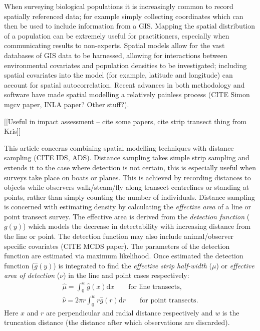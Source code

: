 \documentclass[useAMS,referee]{biom}
\begin{document}
When surveying biological populations it is increasingly common to record spatially referenced data; for example simply collecting coordinates which can then be used to include information from a GIS. Mapping the spatial distribution of a population can be extremely useful for practitioners, especially when communicating results to non-experts. Spatial models allow for the vast databases of GIS data to be harnessed, allowing for interactions between environmental covariates and population densities to be investigated; including spatial covariates into the model (for example, latitude and longitude) can account for spatial autocorrelation. Recent advances in both methodology and software have made spatial modelling a relatively painless process (CITE Simon mgcv paper, INLA paper? Other stuff?).

[[Useful in impact assessment -- cite some papers, cite strip transect thing from Kris]]

This article concerns combining spatial modelling techniques with distance sampling (CITE IDS, ADS). Distance sampling takes simple strip sampling and extends it to the case where detection is not certain, this is especially useful when surveys take place on boats or planes. This is achieved by recording distances to objects while observers walk/steam/fly along transect centrelines or standing at points, rather than simply counting the number of individuals. Distance sampling is concerned with estimating density by calculating the \textit{effective area} of a line or point transect survey. The effective area is derived from the \textit{detection function} ($g(y)$) which models the decrease in detectability with increasing distance from the line or point. The detection function may also include animal/observer specific covariates (CITE MCDS paper). The parameters of the detection function are estimated via maximum likelihood. Once estimated the detection function ($\hat{g}(y)$) is integrated to find the \textit{effective strip half-width} ($\mu$) or \textit{effective area of detection} ($\nu$) in the line and point cases respectively:
\begin{eqnarray*}
\hat{\mu} = \int_0^w \hat{g}(x) \text{d}x \qquad \text{for line transects},\\
\hat{\nu} = 2\pi r \int_0^w r \hat{g}(r) \text{d}r \qquad \text{for point transects}.
\end{eqnarray*}
Here $x$ and $r$ are perpendicular and radial distance respectively and $w$ is the truncation distance (the distance after which observations are discarded).
\end{document}
